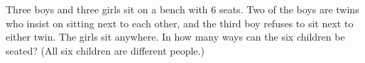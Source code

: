 Three boys and three girls sit on a bench with $6$ seats. Two of the boys are twins who insist on sitting next to each other, and the third boy refuses to sit next to either twin. The girls sit anywhere. In how many ways can the six children be seated? (All six children are different people.)
